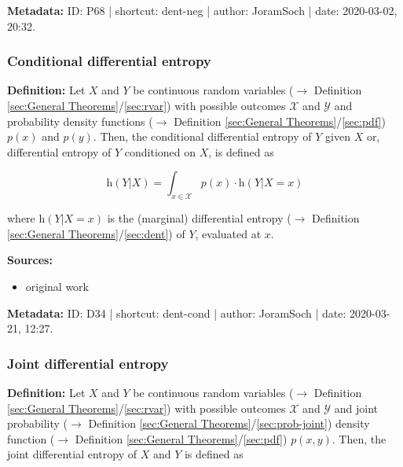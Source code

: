 \documentclass[a4paper,12pt,twoside]{book}
\begin{document}
\vspace{1em}
\textbf{Metadata:} ID: P68 | shortcut: dent-neg | author: JoramSoch | date: 2020-03-02, 20:32.
\vspace{1em}



\subsubsection[\textit{Conditional differential entropy}]{Conditional differential entropy} \label{sec:dent-cond}
\setcounter{equation}{0}

\textbf{Definition:} Let $X$ and $Y$ be continuous random variables ($\rightarrow$ Definition \ref{sec:General Theorems}/\ref{sec:rvar}) with possible outcomes $\mathcal{X}$ and $\mathcal{Y}$ and probability density functions ($\rightarrow$ Definition \ref{sec:General Theorems}/\ref{sec:pdf}) $p(x)$ and $p(y)$. Then, the conditional differential entropy of $Y$ given $X$ or, differential entropy of $Y$ conditioned on $X$, is defined as

\begin{equation} \label{eq:dent-cond-dent-cond}
\mathrm{h}(Y|X) = \int_{x \in \mathcal{X}} p(x) \cdot \mathrm{h}(Y|X=x)
\end{equation}

where $\mathrm{h}(Y \vert X=x)$ is the (marginal) differential entropy ($\rightarrow$ Definition \ref{sec:General Theorems}/\ref{sec:dent}) of $Y$, evaluated at $x$.


\vspace{1em}
\textbf{Sources:}
\begin{itemize}
\item original work\end{itemize}


\vspace{1em}
\textbf{Metadata:} ID: D34 | shortcut: dent-cond | author: JoramSoch | date: 2020-03-21, 12:27.
\vspace{1em}



\subsubsection[\textit{Joint differential entropy}]{Joint differential entropy} \label{sec:dent-joint}
\setcounter{equation}{0}

\textbf{Definition:} Let $X$ and $Y$ be continuous random variables ($\rightarrow$ Definition \ref{sec:General Theorems}/\ref{sec:rvar}) with possible outcomes $\mathcal{X}$ and $\mathcal{Y}$ and joint probability ($\rightarrow$ Definition \ref{sec:General Theorems}/\ref{sec:prob-joint}) density function ($\rightarrow$ Definition \ref{sec:General Theorems}/\ref{sec:pdf}) $p(x,y)$. Then, the joint differential entropy of $X$ and $Y$ is defined as
\end{document}
